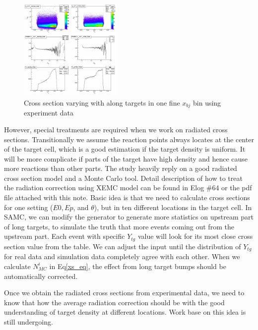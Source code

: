 \documentclass[a4paper,10.5pt]{report}
\begin{document}
\begin{figure}[!ht]
 \begin{center}
  \includegraphics[type=pdf, ext=.pdf,read=.pdf,width=0.44\textwidth]{../figures/target/Data_He3_4085_Ytg_Xbj}
  \caption[Cross section varying with along targets in data]{Cross section varying with along targets in one fine $x_{bj}$ bin using experiment data}
  \label{xs_bump_data}
 \end{center}
\end{figure}

However, special treatments are required when we work on radiated cross sections. Transitionally we assume the reaction points always locates at the center of the target cell, which is a good estimation if the target density is uniform. It will be more complicate if parts of the target have high density and hence cause more reactions than other parts. The study heavily reply on a good radiated cross section model and a Monte Carlo tool. Detail description of how to treat the radiation correction using XEMC model can be found in Elog \#64 or the pdf file attached with this note. Basic idea is that we need to calculate cross sections for one setting ($E0, Ep$, and $\theta$), but in ten different locations in the target cell. In SAMC, we can modify the generator to generate more statistics on upstream part of long targets, to simulate the truth that more events coming out from the upstream part. Each event with specific $Y_{tg}$ value will look for its most close cross section value from the table. We can adjust the input until the distribution of $Y_{tg}$ for real data and simulation data completely agree with each other. When we calculate $N_{MC}^{i}$ in Eq\eqref{xs_eq}, the effect from long target bumps should be automatically corrected.

Once we obtain the radiated cross sections from experimental data, we need to know that how the average radiation correction should be with the good understanding of target density at different locations. Work base on this idea is still undergoing.
\end{document}
